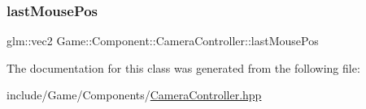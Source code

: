 \subsubsection{\texorpdfstring{last\+Mouse\+Pos}{lastMousePos}}
{\footnotesize\ttfamily glm\+::vec2 Game\+::\+Component\+::\+Camera\+Controller\+::last\+Mouse\+Pos}



The documentation for this class was generated from the following file\+:\begin{DoxyCompactItemize}
\item 
include/\+Game/\+Components/\mbox{\hyperlink{_camera_controller_8hpp}{Camera\+Controller.\+hpp}}\end{DoxyCompactItemize}
